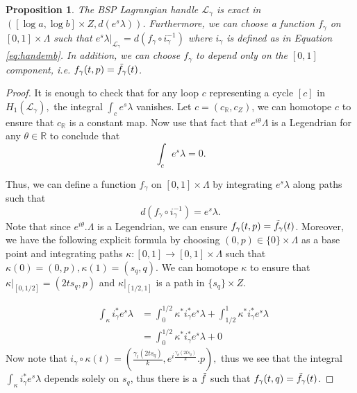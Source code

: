 \documentclass[10pt,a4paper]{amsart}
\newtheorem{prop}{Proposition}
\newcommand{\bR}{\mathbb{R}}
\newcommand{\cL}{\mathcal{L}}
\newcommand{\inv}{^{-1}}
\renewcommand{\to}{\rightarrow}
\begin{document}
\begin{prop}\label{prop:exact_in_neck}
    The BSP Lagrangian handle $\cL_\gamma$ is exact in $([\log a, \log b] \times Z, d(e^s\lambda))$. Furthermore, we can choose a function $f_\gamma$ on $[0,1]\times \Lambda$ such that $e^s\lambda|_{\cL_\gamma} = d (f_\gamma \circ i_\gamma\inv)$ where $i_\gamma $ is defined as in Equation \ref{eq:handemb}. In addition, we can choose $f_\gamma$ to depend only on the $[0,1]$ component, i.e.
    $f_\gamma (t,p) = \Tilde{f}_\gamma(t)$.
\end{prop}

\begin{proof}
    It is enough to check that for any loop $c$ representing a cycle $[c]$ in $H_1(\cL_\gamma),$ the integral $\int_c e^s\lambda$ vanishes. Let $c = (c_\bR, c_Z)$, we can homotope $c$ to ensure that $c_\bR$ is a constant map. Now use that fact that $e^{i\theta} \Lambda$ is a Legendrian for any $\theta \in \bR$ to conclude that $$\int_c e^s\lambda = 0.$$

    \noindent Thus, we can define a function $f_\gamma$ on $[0,1]\times \Lambda$ by integrating $e^s\lambda$ along paths such that 
    $$ d (f_\gamma \circ i_\gamma\inv) = e^s\lambda.$$Note that since $e^{i\theta}.\Lambda$ is a Legendrian, we can ensure $f_\gamma(t,p)= \Tilde{f}_\gamma(t)$. Moreover, we have the following explicit formula by choosing $(0,p) \in \{ 0\} \times \Lambda$ as a base point and integrating paths $\kappa: [0,1] \to [0,1]\times \Lambda$ such that $\kappa(0)= (0,p) , \kappa(1)=(s_q,q)$. We can homotope $\kappa$ to ensure that $\kappa|_{[0,1/2]}=(2ts_q,p)$ and $\kappa|_{[1/2,1] }$ is a path in $\{s_q \} \times Z$.  

    \begin{align}
    \;\;\int_\kappa i_\gamma^* e^s\lambda  &= \int_0^{1/2} \kappa^*  i_\gamma^* e^s \lambda + \int_{1/2}^1 \kappa^* 
  i_\gamma^* e^s \lambda\\
    &=\int_0^{1/2} \kappa^*   i_\gamma^* e^s \lambda + 0
    \end{align}
    Now note that $i_\gamma \circ \kappa (t) = \left (\frac{\gamma_l(2ts_q)}{k}, e^{i\frac{\gamma_\theta(2ts_q)}{k}}.p\right),$ thus we see that the integral $\int_\kappa i_\gamma^* e^s\lambda$ depends solely on $s_q$, thus there is a $\Tilde{f}$ such that $f_\gamma(t,q)=\Tilde{f}_\gamma(t)$.
\end{proof}
\end{document}
